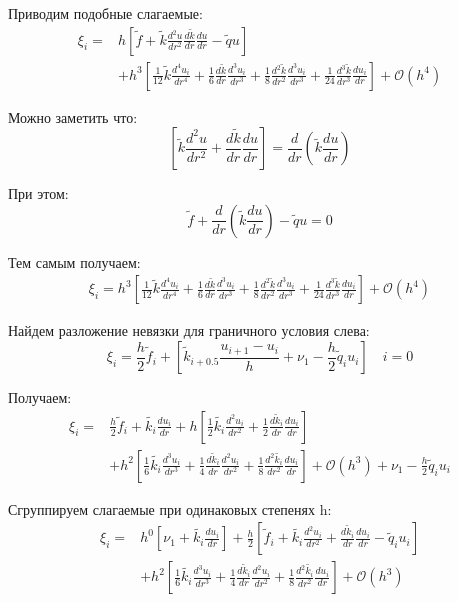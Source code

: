 Приводим подобные слагаемые:
\begin{align*}
  \xi_i = &h \left [ \tilde{f} + \tilde{k} \frac{d^2u}{dr^2} \frac{d\tilde{k}}{dr}\frac{du}{dr} - \tilde{q}u \right ] \\
  &+ h^3 \left[ \frac{1}{12}\tilde{k} \frac{d^4 u_i}{d r^4}  + \frac{1}{6} \frac{d \tilde{k}}{dr} \frac{d^3 u_i}{d r^3} 
  + \frac{1}{8} \frac{d^2 \tilde{k}}{dr^2} \frac{d^3 u_i}{d r^3} + \frac{1}{24} \frac{d^3 \tilde{k}}{dr^3} \frac{d u_i}{d r} 
  \right] + \mathcal{O}(h^4)
\end{align*}

Можно заметить что:
\[
  \left [ \tilde{k} \frac{d^2u}{dr^2} + \frac{d\tilde{k}}{dr}\frac{du}{dr} \right ] =
  \frac{d}{dr}\left ( \tilde{k} \frac{du}{dr} \right )
\]

При этом:
\[
  \tilde{f} + \frac{d}{dr}\left ( \tilde{k} \frac{du}{dr} \right ) - \tilde{q}u = 0
\]

Тем самым получаем:
\begin{align*}
  \xi_i = h^3 \left[ \frac{1}{12}\tilde{k} \frac{d^4 u_i}{d r^4}  + \frac{1}{6} \frac{d \tilde{k}}{dr} \frac{d^3 u_i}{d r^3} 
  + \frac{1}{8} \frac{d^2 \tilde{k}}{dr^2} \frac{d^3 u_i}{d r^3} + \frac{1}{24} \frac{d^3 \tilde{k}}{dr^3} \frac{d u_i}{d r} 
  \right] + \mathcal{O}(h^4)
\end{align*}

Найдем разложение невязки для граничного условия слева:
\[
  \xi_i = \frac{h}{2} \tilde{f}_i + \left [ \tilde{k}_{i+0.5}\frac{u_{i+1}-u_i}{h} + \nu_1 - \frac{h}{2} \tilde{q}_i u_i \right ] \quad i = 0
\]

Получаем:
\begin{align*}
  \xi_i = &\frac{h}{2} \tilde{f}_i + \tilde{k_i} \frac{du_i}{dr} + h \left [ \frac{1}{2}\tilde{k_i} \frac{d^2 u_i}{d r^2} + \frac{1}{2}\frac{d \tilde{k}_i}{dr} \frac{d u_i}{d r} \right ] \\
  &+ h^2 \left [ \frac{1}{6}\tilde{k_i} \frac{d^3 u_i}{d r^3} + \frac{1}{4}\frac{d \tilde{k}_i}{dr} \frac{d^2 u_i}{d r^2} + \frac{1}{8}\frac{d^2 \tilde{k_i}}{dr^2} \frac{d u_i}{d r} \right ]
  + \mathcal{O}(h^3) + \nu_1 - \frac{h}{2} \tilde{q}_i u_i
\end{align*}

Сгруппируем слагаемые при одинаковых степенях h:
\begin{align*}
  \xi_i = & h^0 \left[ \nu_1 + \tilde{k_i} \frac{du_i}{dr}\right]
  + \frac{h}{2} \left[ \tilde{f}_i + \tilde{k_i} \frac{d^2 u_i}{d r^2} + \frac{d \tilde{k}_i}{dr} \frac{d u_i}{d r} - \tilde{q}_i u_i \right] \\
  &+ h^2 \left [ \frac{1}{6}\tilde{k_i} \frac{d^3 u_i}{d r^3} + \frac{1}{4}\frac{d \tilde{k}_i}{dr} \frac{d^2 u_i}{d r^2} + \frac{1}{8}\frac{d^2 \tilde{k_i}}{dr^2} \frac{d u_i}{d r} \right ] + \mathcal{O}(h^3)
\end{align*}

